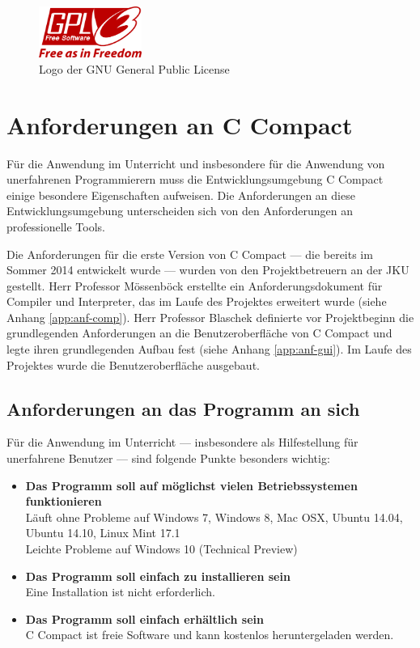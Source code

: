 \begin{figure}[h!]
	\centering
	\includegraphics[width=0.3\textwidth]{./media/images/intro/GPLv3-Logo.png}
	\caption{Logo der GNU General Public License}
\end{figure}

\section{Anforderungen an C Compact}
\label{sec:intro.anf}
Für die Anwendung im Unterricht und insbesondere für die Anwendung von unerfahrenen Programmierern muss die Entwicklungsumgebung C Compact einige besondere Eigenschaften aufweisen. Die Anforderungen an diese Entwicklungsumgebung unterscheiden sich von den Anforderungen an professionelle Tools.

Die Anforderungen für die erste Version von C Compact --- die bereits im Sommer 2014 entwickelt wurde --- wurden von den Projektbetreuern an der JKU gestellt. Herr Professor Mössenböck erstellte ein Anforderungsdokument für Compiler und Interpreter, das im Laufe des Projektes erweitert wurde (siehe Anhang \ref{app:anf-comp}). Herr Professor Blaschek definierte vor Projektbeginn die grundlegenden Anforderungen an die Benutzeroberfläche von C Compact und legte ihren grundlegenden Aufbau fest (siehe Anhang \ref{app:anf-gui}). Im Laufe des Projektes wurde die Benutzeroberfläche ausgebaut.

\subsection*{Anforderungen an das Programm an sich}
Für die Anwendung im Unterricht --- insbesondere als Hilfestellung für unerfahrene Benutzer --- sind folgende Punkte besonders wichtig:
\begin{itemize}
\item \textbf{Das Programm soll auf möglichst vielen Betriebssystemen funktionieren}\\
Läuft ohne Probleme auf Windows 7, Windows 8, Mac OSX, Ubuntu 14.04, Ubuntu 14.10, Linux Mint 17.1\\
Leichte Probleme auf Windows 10 (Technical Preview)
\item \textbf{Das Programm soll einfach zu installieren sein}\\
Eine Installation ist nicht erforderlich.
\item \textbf{Das Programm soll einfach erhältlich sein}\\
C Compact ist freie Software und kann kostenlos heruntergeladen werden.
\end{itemize}

